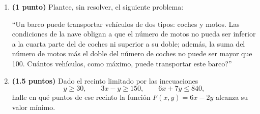 
\begin{enumerate}[label=\alph*)]
\item \textbf{(1 punto)} Plantee, sin resolver, el siguiente problema:

``Un barco puede transportar vehículos de dos tipos: coches y motos. Las condiciones de la nave obligan a que el número de motos no pueda ser inferior a la cuarta parte del de coches ni superior a su doble; además, la suma del número de motos más el doble del número de coches no puede ser mayor que 100. \textquestiondown{}Cuántos vehículos, como máximo, puede transportar este barco?''
\item \textbf{(1.5 puntos)} Dado el recinto limitado por las inecuaciones
\[
y\geq30,\qquad3x-y\geq150,\qquad6x+7y\leq840,
\]
halle en qué puntos de ese recinto la función $F(x,y)=6x-2y$ alcanza su valor mínimo.
\end{enumerate}
